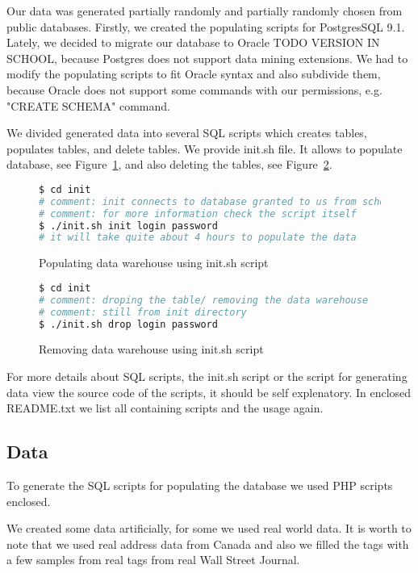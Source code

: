 
Our data was generated partially randomly and partially randomly chosen from public databases.
Firstly, we created the populating scripts for PostgresSQL 9.1. Lately, we decided to migrate
our database to Oracle TODO VERSION IN SCHOOL, because Postgres does not support data mining extensions.
We had to modify the populating scripts to fit Oracle syntax and also subdivide them,
because Oracle does not support some commands with our permissions, e.g. "CREATE SCHEMA" command.

We divided generated data into several SQL scripts which creates tables, populates tables, and delete tables.
We provide init.sh file. It allows to populate database, see Figure~\ref{l:ml1_init}, and also deleting the tables, see Figure~\ref{l:ml1_drop}.
\begin{figure}[!hbp]
\begin{lstlisting}[language=bash]
$ cd init
# comment: init connects to database granted to us from school
# comment: for more information check the script itself
$ ./init.sh init login password
# it will take quite about 4 hours to populate the data
\end{lstlisting}
\caption{Populating data warehouse using  init.sh script} \label{l:ml1_init}
\end{figure}

\begin{figure}[!hbp]
\begin{lstlisting}[language=bash]
$ cd init
# comment: droping the table/ removing the data warehouse 
# comment: still from init directory
$ ./init.sh drop login password
\end{lstlisting}
\caption{Removing data warehouse using  init.sh script} \label{l:ml1_drop}
\end{figure}

For more details about SQL scripts, the init.sh script or the script for generating data view the source code of the scripts, it should be self explenatory. In enclosed README.txt we list all containing scripts and the usage again.

\subsection*{Data}
To generate the SQL scripts for populating the database we used PHP scripts enclosed.

We created some data artificially, for some we used real world data.
It is worth to note that we used real address data from Canada and also we filled the tags with a few samples from real tags from real Wall Street Journal.


